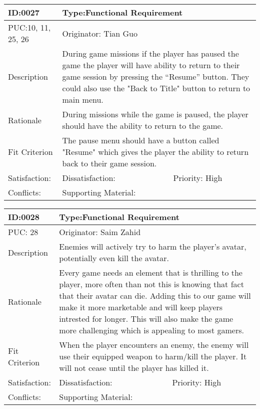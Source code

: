 \documentclass{article}
\begin{document}
	\begin{table}[H]
		\begin{tabular}{|l|l|l|}
			\hline
			ID:0027 & \multicolumn{2}{l|}{Type:Functional Requirement} \\ \hline
			PUC:10, 11, 25, 26 & \multicolumn{2}{l|}{Originator: Tian Guo} \\ \hline
			Description & \multicolumn{2}{m{0.85\textwidth}|}{During game missions if the player has paused the game the player will have ability to return to their game session by pressing the “Resume” button. They could also use the "Back to Title" button to return to main menu.} \\ \hline
			Rationale & \multicolumn{2}{m{0.85\textwidth}|}{During missions while the game is paused, the player should have the ability to return to the game.} \\ \hline
			Fit Criterion & \multicolumn{2}{m{0.85\textwidth}|}{The pause menu should have a button called "Resume" which gives the
			player the ability to return back to their game session.} \\ \hline
			Satisfaction: & Dissatisfaction: & Priority: High\\ \hline
			Conflicts: & \multicolumn{2}{l|}{Supporting Material:} \\ \hline
		\end{tabular}
	\end{table}

	\begin{table}[H]
		\begin{tabular}{|l|l|l|}
			\hline
			ID:0028 & \multicolumn{2}{l|}{Type:Functional Requirement} \\ \hline
			PUC: 28 & \multicolumn{2}{l|}{Originator: Saim Zahid} \\ \hline
			Description & \multicolumn{2}{m{0.85\textwidth}|}{Enemies will actively try to harm the player's avatar, potentially even kill the avatar.} \\ \hline
			Rationale & \multicolumn{2}{m{0.85\textwidth}|}{Every game needs an element that is thrilling to the player, more often than not this is knowing that fact that their avatar can die. Adding this to our game will make it more marketable and will keep players intrested for longer. This will also make the game more challenging which is appealing to most gamers.} \\ \hline
			Fit Criterion & \multicolumn{2}{m{0.85\textwidth}|}{When the player encounters an enemy, the enemy will use their equipped weapon to harm/kill the player. It will not cease until the player has killed it.} \\ \hline
			Satisfaction: & Dissatisfaction: & Priority: High\\ \hline
			Conflicts: & \multicolumn{2}{l|}{Supporting Material:} \\ \hline
		\end{tabular}
	\end{table}
\end{document}
